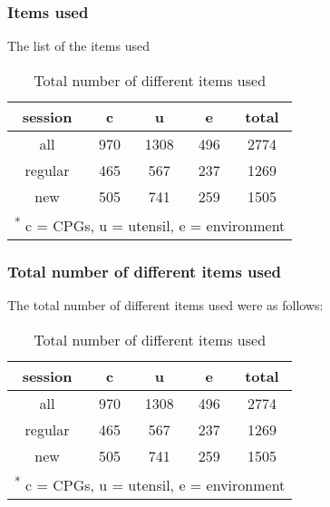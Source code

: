 \documentclass[]{article}
\begin{document}
\subsubsection{Items used}\label{items-used}

The list of the items used

\begin{table}

\caption{\label{tab:unnamed-chunk-11}Total number of different items used}
\centering
\begin{tabular}[t]{c|c|c|c|c}
\hline
session & c & u & e & total\\
\hline
all & 970 & 1308 & 496 & 2774\\
\hline
regular & 465 & 567 & 237 & 1269\\
\hline
new & 505 & 741 & 259 & 1505\\
\hline
\multicolumn{5}{l}{\textsuperscript{*} c = CPGs, u = utensil, e = environment}\\
\end{tabular}
\end{table}

\subsubsection{Total number of different items
used}\label{total-number-of-different-items-used}

The total number of different items used were as follows:

\begin{table}

\caption{\label{tab:unnamed-chunk-12}Total number of different items used}
\centering
\begin{tabular}[t]{c|c|c|c|c}
\hline
session & c & u & e & total\\
\hline
all & 970 & 1308 & 496 & 2774\\
\hline
regular & 465 & 567 & 237 & 1269\\
\hline
new & 505 & 741 & 259 & 1505\\
\hline
\multicolumn{5}{l}{\textsuperscript{*} c = CPGs, u = utensil, e = environment}\\
\end{tabular}
\end{table}
\end{document}
